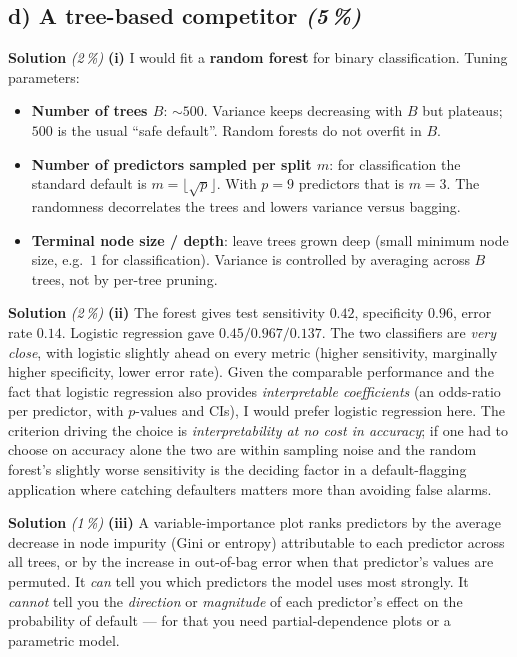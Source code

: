 \documentclass[11pt,a4paper]{article}
\newcommand{\subpoints}[1]{\textit{(#1\,\%)}}
\newcommand{\sol}{\noindent\textbf{Solution}}
\begin{document}
\subsection*{d) A tree-based competitor \subpoints{5}}

\sol{} \subpoints{2} \textbf{(i)} I would fit a \textbf{random forest} for binary classification.
Tuning parameters:
\begin{itemize}
  \item \textbf{Number of trees $B$}: $\sim 500$. Variance keeps decreasing with $B$ but plateaus;
        $500$ is the usual ``safe default''. Random forests do not overfit in $B$.
  \item \textbf{Number of predictors sampled per split $m$}: for classification the standard
        default is $m=\lfloor\sqrt{p}\rfloor$. With $p=9$ predictors that is $m=3$. The randomness
        decorrelates the trees and lowers variance versus bagging.
  \item \textbf{Terminal node size / depth}: leave trees grown deep (small minimum node size,
        e.g.\ $1$ for classification). Variance is controlled by averaging across $B$ trees, not
        by per-tree pruning.
\end{itemize}

\medskip
\sol{} \subpoints{2} \textbf{(ii)} The forest gives test sensitivity $0.42$, specificity $0.96$,
error rate $0.14$. Logistic regression gave $0.45 / 0.967 / 0.137$. The two classifiers are
\emph{very close}, with logistic slightly ahead on every metric (higher sensitivity, marginally
higher specificity, lower error rate). Given the comparable performance and the fact that logistic
regression also provides \emph{interpretable coefficients} (an odds-ratio per predictor, with $p$-values
and CIs), I would prefer logistic regression here. The criterion driving the choice is
\emph{interpretability at no cost in accuracy}; if one had to choose on accuracy alone the two are
within sampling noise and the random forest's slightly worse sensitivity is the deciding factor
in a default-flagging application where catching defaulters matters more than avoiding false alarms.

\medskip
\sol{} \subpoints{1} \textbf{(iii)} A variable-importance plot ranks predictors by the average
decrease in node impurity (Gini or entropy) attributable to each predictor across all trees, or by
the increase in out-of-bag error when that predictor's values are permuted. It \emph{can} tell you
which predictors the model uses most strongly. It \emph{cannot} tell you the \emph{direction} or
\emph{magnitude} of each predictor's effect on the probability of default --- for that you need
partial-dependence plots or a parametric model.
\end{document}
